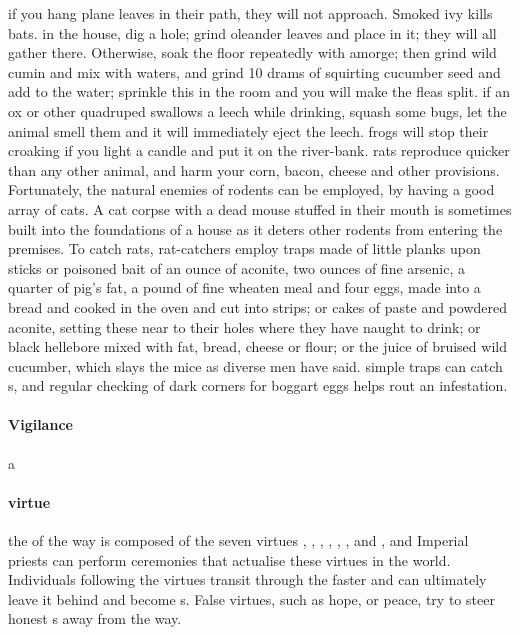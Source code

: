 \localpar {} if you hang plane leaves in their path, they will not approach. Smoked ivy kills bats. \localpar {} in the house, dig a hole; grind oleander leaves and place in it; they will all gather there. Otherwise, soak the floor repeatedly with amorge; then grind wild cumin and mix with waters, and grind 10 drams of squirting cucumber seed and add to the water; sprinkle this in the room and you will make the fleas split. \localpar {} if an ox or other quadruped swallows a leech while drinking, squash some bugs, let the animal smell them and it will immediately eject the leech. \localpar {} frogs will stop their croaking if you light a candle and put it on the river-bank. \localpar {} rats reproduce quicker than any other animal, and harm your corn, bacon, cheese and other provisions. Fortunately, the natural enemies of rodents can be employed, by having a good array of cats. A cat corpse with a dead mouse stuffed in their mouth is sometimes built into the foundations of a house as it deters other rodents from entering the premises. To catch rats, rat-catchers employ traps made of little planks upon sticks or poisoned bait of an ounce of aconite, two ounces of fine arsenic, a quarter of pig's fat, a pound of fine wheaten meal and four eggs, made into a bread and cooked in the oven and cut into strips; or cakes of paste and powdered aconite, setting these near to their holes where they have naught to drink; or black hellebore mixed with fat, bread, cheese or flour; or the juice of bruised wild cucumber, which slays the mice as diverse men have said. \localpar {} simple traps can catch s, and regular checking of dark corners for boggart eggs helps rout an infestation. \bigparagraphendtwiddle
\paragraph{Vigilance} a  
\paragraph{virtue} the  of the way is composed of the seven virtues , , , , , , and , and Imperial priests can perform ceremonies that actualise these virtues in the world. Individuals following the virtues transit through the  faster and can ultimately leave it behind and become s. False virtues, such as hope,  or peace, try to steer honest s away from the way. 
